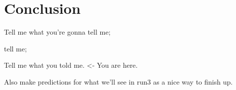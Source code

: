 \chapter{Conclusion}\label{chapter:conclusion}

Tell me what you're gonna tell me;

tell me;

Tell me what you told me. <- You are here.


Also make predictions for what we'll see in run3 as a nice way to finish up.
